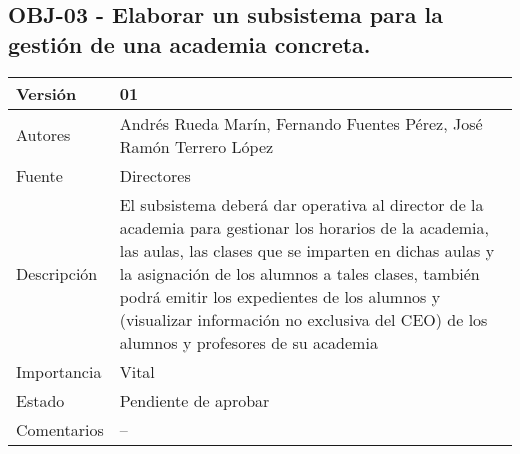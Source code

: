 \subsection{OBJ-03 - Elaborar un subsistema para la gestión de una academia concreta.}

\begin{tabular}{|p{4cm}|p{12cm}|}
\hline 
Versión & 01 \\ 
\hline 
Autores & Andrés Rueda Marín, Fernando Fuentes Pérez, José Ramón Terrero López \\ 
\hline 
Fuente & Directores \\ 
\hline 
Descripción & El subsistema deberá dar operativa al director de la academia para gestionar los horarios de la academia, las aulas, las clases que se imparten en dichas aulas y la asignación de los alumnos a tales clases, también podrá emitir los expedientes de los alumnos y (visualizar información no exclusiva del CEO) de los alumnos y profesores de su academia \\ 
\hline 
Importancia & Vital \\ 
\hline 
Estado & Pendiente de aprobar \\ 
\hline 
Comentarios & -- \\ 
\hline 
\end{tabular}